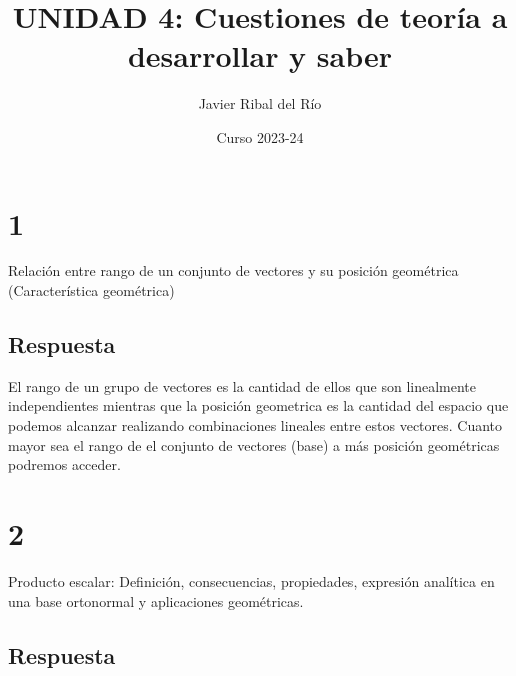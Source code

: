 \documentclass[
	12pt, %
	spanish, %
]{fphw}
\title{UNIDAD 4: Cuestiones de teoría a desarrollar y saber} %
\author{Javier Ribal del Río} %
\date{Curso 2023-24}
\institute{Colegio Salesianos San Juan Bosco} %
\begin{document}
\maketitle %


\section*{1}

\begin{problem}
	Relación entre rango de un conjunto de vectores y su posición geométrica
	(Característica geométrica)\end{problem}



\subsection*{Respuesta} El rango de un grupo de vectores es la cantidad de ellos que son linealmente independientes mientras que la posición geometrica es la cantidad del espacio que podemos alcanzar realizando combinaciones lineales entre estos vectores. Cuanto mayor sea el rango de el conjunto de vectores (base) a más posición geométricas podremos acceder.


\section*{2}

\begin{problem}
	Producto escalar: Definición, consecuencias, propiedades, expresión analítica
	en una base ortonormal y aplicaciones geométricas.	
	
\end{problem}


\subsection*{Respuesta}
\end{document}
